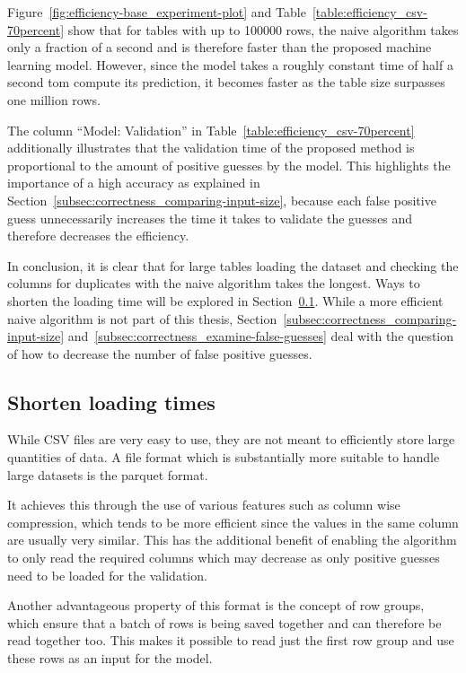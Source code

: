 Figure~\ref{fig:efficiency-base_experiment-plot} and Table~\ref{table:efficiency_csv-70percent} show that for tables with up to \num{100000} rows, the naive algorithm takes only a fraction of a second and is therefore faster than the proposed machine learning model. However, since the model takes a roughly constant time of half a second tom compute its prediction, it becomes faster as the table size surpasses one million rows.

The column \enquote{Model: Validation} in Table~\ref{table:efficiency_csv-70percent} additionally illustrates that the validation time of the proposed method is proportional to the amount of positive guesses by the model. This highlights the importance of a high accuracy as explained in Section~\ref{subsec:correctness_comparing-input-size}, because each false positive guess unnecessarily increases the time it takes to validate the guesses and therefore decreases the efficiency.

In conclusion, it is clear that for large tables loading the dataset and checking the columns for duplicates with the naive algorithm takes the longest. Ways to shorten the loading time will be explored in Section~\ref{subsec:efficiency-shorter_loading_times}. While a more efficient naive algorithm is not part of this thesis, Section~\ref{subsec:correctness_comparing-input-size} and~\ref{subsec:correctness_examine-false-guesses} deal with the question of how to decrease the number of false positive guesses.




\subsection{Shorten loading times}\label{subsec:efficiency-shorter_loading_times}
While CSV files are very easy to use, they are not meant to efficiently store large quantities of data. A file format which is substantially more suitable to handle large datasets is the parquet format\cite{parquet-book}.

It achieves this through the use of various features such as column wise compression, which tends to be more efficient since the values in the same column are usually very similar. This has the additional benefit of enabling the algorithm to only read the required columns which may decrease \io{} as only positive guesses need to be loaded for the validation.

Another advantageous property of this format is the concept of row groups, which ensure that a batch of rows is being saved together and can therefore be read together too. This makes it possible to read just the first row group and use these rows as an input for the model.

